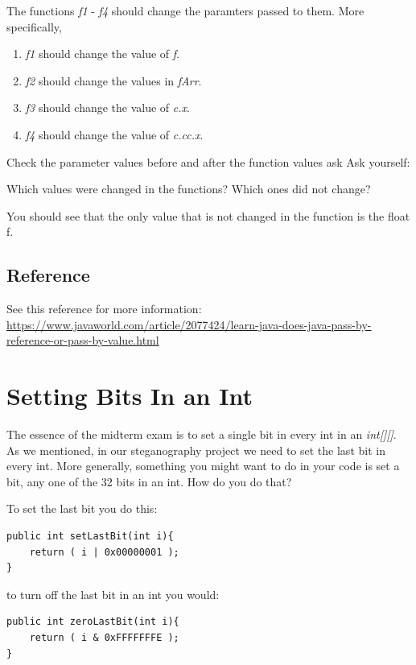 \documentclass[12pt]{article}
\begin{document}
The functions \textit{f1} - \textit{f4} should change the paramters passed to them. More specifically,

\begin{enumerate}
\item\textit{f1} should change the value of \textit{f}.
\item\textit{f2} should change the values in \textit{fArr}.
\item \textit{f3} should change the value of \textit{c.x}.
\item \textit{f4} should change the value of \textit{c.cc.x}.
\end{enumerate}


Check the parameter values before and after the function values ask Ask yourself:

\begin{center}
{\Large Which values were changed in the functions? Which ones did not change?}
\end{center}

You should see that the only value that is not changed in the function is the float f.

\subsection{Reference}
See this reference for more information: 
\url{https://www.javaworld.com/article/2077424/learn-java-does-java-pass-by-reference-or-pass-by-value.html}

\section{Setting Bits In an Int}
The essence of the midterm exam is to set a single bit in every int in an \textit{int[][]}. As we mentioned, in our steganography project we need to set the last bit in every int. More generally, something you might want to do in your code is set a bit, any one of the 32 bits in an int. How do you do that?

To set the last bit you do this:

\begin{lstlisting}
public int setLastBit(int i){
	return ( i | 0x00000001 );
}
\end{lstlisting}

to turn off the last bit in an int you would:

\begin{lstlisting}
public int zeroLastBit(int i){
	return ( i & 0xFFFFFFFE );
}
\end{lstlisting}
\end{document}
